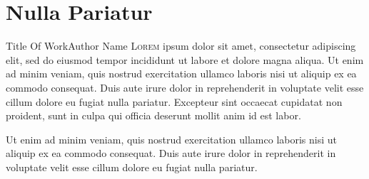 \documentclass[../main.tex]{subfiles}
\begin{document}
	\chapter{Nulla Pariatur}

	\begin{article*}{Title Of Work}{Author Name}
		\lettrine[lines=3, findent=3pt, nindent=0pt]{L}{orem}
		ipsum dolor sit amet, consectetur adipiscing elit, sed do eiusmod
		tempor incididunt ut labore et dolore magna aliqua. Ut enim ad minim
		veniam, quis nostrud exercitation ullamco laboris nisi ut aliquip ex ea
		commodo consequat. Duis aute irure dolor in reprehenderit in voluptate
		velit esse cillum dolore eu fugiat nulla pariatur. Excepteur sint occaecat
		cupidatat non proident, sunt in culpa qui officia deserunt mollit anim id
		est labor.

		Ut enim ad minim veniam, quis nostrud exercitation ullamco 
		laboris nisi ut aliquip ex ea commodo consequat. Duis aute irure dolor 
		in reprehenderit in voluptate velit esse cillum dolore eu fugiat nulla 
		pariatur.

		\lipsum[4-10]
	\end{article*}
\end{document}
